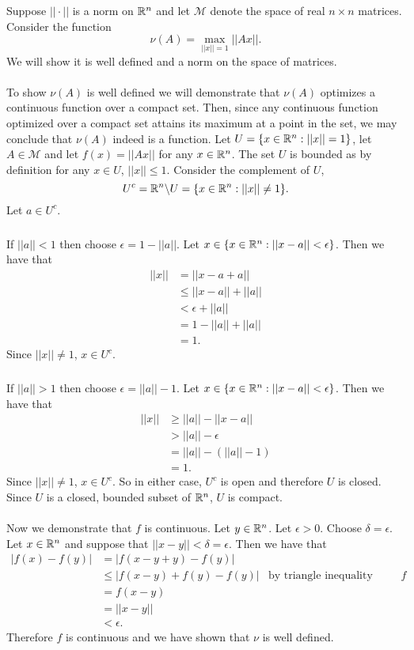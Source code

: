 \documentclass[letterpaper,12pt,oneside,onecolumn]{article}
\newcommand{\cM}{\mathcal{M}} \newcommand{\cN}{\mathcal{N}}
\begin{document}
\section{}
\paragraph{}
Suppose $||\cdot||$ is a norm on $\mathbb{R}^n$ and let $\cM$ denote the space of real $n \times n$ matrices. Consider the function $$\nu(A) = \max_{||x||=1} ||Ax||.$$
We will show it is well defined and a norm on the space of matrices.
\paragraph{}
To show $\nu(A)$ is well defined we will demonstrate that $\nu(A)$ optimizes a continuous function over a compact set. Then, since any continuous function optimized over a compact set attains its maximum at a point in the set, we may conclude that $\nu(A)$ indeed is a function. Let $U = \{x \in \mathbb{R}^n: ||x|| = 1\}$, let $A\in \cM$ and let $f(x) = ||Ax||$ for any $x \in \mathbb{R}^n$. The set $U$ is bounded as by definition for any $x \in U$, $||x|| \leq 1$. Consider the complement of $U$, $$U^c = \mathbb{R}^n \backslash U = \{x \in \mathbb{R}^n: ||x|| \neq 1\}.$$ Let $a \in U^c$.
\subparagraph{}
If $||a|| < 1$ then choose $\epsilon = 1 - ||a||$. Let $x \in \{x \in \mathbb{R}^n: ||x-a|| < \epsilon\}$. Then we have that
\begin{align*}
||x|| &= ||x-a + a|| \\
&\leq ||x-a|| + ||a|| \\
&< \epsilon + ||a|| \\
&= 1 - ||a|| + ||a|| \\
&= 1.
\end{align*} 
Since $||x|| \neq 1$, $x\in U^c$.
\subparagraph{}
If $||a|| > 1$ then choose $\epsilon = ||a|| - 1$. Let $x \in \{x \in \mathbb{R}^n: ||x-a|| < \epsilon\}$. Then we have that
\begin{align*}
||x|| &\geq ||a|| - ||x-a|| \\
&> ||a|| - \epsilon \\
&= ||a|| -(||a|| - 1) \\
&= 1.
\end{align*}
Since $||x|| \neq 1$, $x \in U^c$. So in either case, $U^c$ is open and therefore $U$ is closed. 
Since $U$ is a closed, bounded subset of $\mathbb{R}^n$, $U$ is compact.
\paragraph{}
Now we demonstrate that $f$ is continuous. Let $y \in \mathbb{R}^n$. Let $\epsilon > 0 $. Choose $\delta = \epsilon$. Let $x \in \mathbb{R}^n$ and suppose that $||x - y|| < \delta = \epsilon$. Then we have that
\begin{align*}
|f(x) - f(y)| &= |f(x - y + y) - f(y)| \\
&\leq |f(x-y) + f(y) -f(y)| &\text{by triangle inequality applied to $f$}\\
&= f(x-y) \\
&= ||x-y|| \\
&< \epsilon.
\end{align*}
Therefore $f$ is continuous and we have shown that $\nu$ is well defined.
\end{document}
